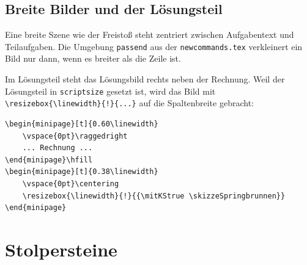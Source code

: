 \subsection{Breite Bilder und der Lösungsteil}

Eine breite Szene wie der Freistoß steht zentriert zwischen Aufgabentext und Teilaufgaben. Die Umgebung \texttt{passend} aus der \texttt{newcommands.tex} verkleinert ein Bild nur dann, wenn es breiter als die Zeile ist.

Im Lösungsteil steht das Lösungsbild rechts neben der Rechnung. Weil der Lösungsteil in \texttt{scriptsize} gesetzt ist, wird das Bild mit \texttt{\textbackslash resizebox\{\textbackslash linewidth\}\{!\}\{...\}} auf die Spaltenbreite gebracht:

\begin{lstlisting}[style=latex]
\begin{minipage}[t]{0.60\linewidth}
	\vspace{0pt}\raggedright
	... Rechnung ...
\end{minipage}\hfill
\begin{minipage}[t]{0.38\linewidth}
	\vspace{0pt}\centering
	\resizebox{\linewidth}{!}{{\mitKStrue \skizzeSpringbrunnen}}
\end{minipage}
\end{lstlisting}



\section{Stolpersteine}

